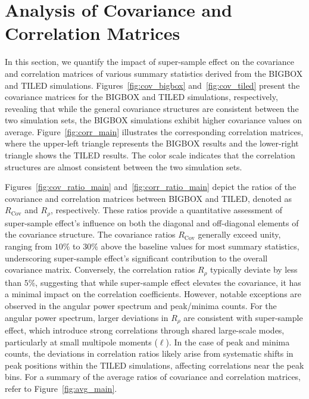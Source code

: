 \clearpage

\section{Analysis of Covariance and Correlation Matrices}
In this section, we quantify the impact of super-sample effect on the covariance and correlation matrices of various summary statistics derived from the BIGBOX and TILED simulations. Figures~\ref{fig:cov_bigbox} and~\ref{fig:cov_tiled} present the covariance matrices for the BIGBOX and TILED simulations, respectively, revealing that while the general covariance structures are consistent between the two simulation sets, the BIGBOX simulations exhibit higher covariance values on average. Figure~\ref{fig:corr_main} illustrates the corresponding correlation matrices, where the upper-left triangle represents the BIGBOX results and the lower-right triangle shows the TILED results. The color scale indicates that the correlation structures are almost consistent between the two simulation sets.

Figures~\ref{fig:cov_ratio_main} and~\ref{fig:corr_ratio_main} depict the ratios of the covariance and correlation matrices between BIGBOX and TILED, denoted as $R_{\text{Cov}}$ and $R_{\rho}$, respectively. These ratios provide a quantitative assessment of super-sample effect's influence on both the diagonal and off-diagonal elements of the covariance structure. The covariance ratios $R_{\text{Cov}}$ generally exceed unity, ranging from $10\%$ to $30\%$ above the baseline values for most summary statistics, underscoring super-sample effect's significant contribution to the overall covariance matrix. Conversely, the correlation ratios $R_{\rho}$ typically deviate by less than $5\%$, suggesting that while super-sample effect elevates the covariance, it has a minimal impact on the correlation coefficients. However, notable exceptions are observed in the angular power spectrum and peak/minima counts. For the angular power spectrum, larger deviations in $R_{\rho}$ are consistent with super-sample effect, which introduce strong correlations through shared large-scale modes, particularly at small multipole moments ($\ell$). In the case of peak and minima counts, the deviations in correlation ratios likely arise from systematic shifts in peak positions within the TILED simulations, affecting correlations near the peak bins. For a summary of the average ratios of covariance and correlation matrices, refer to Figure~\ref{fig:avg_main}. 

